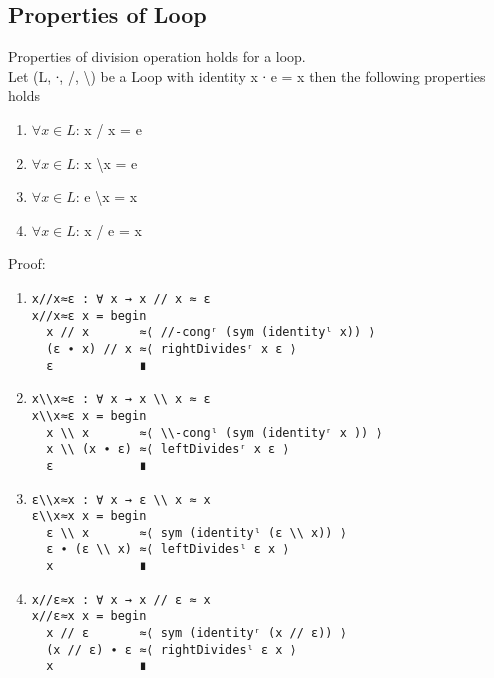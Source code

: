\subsection{Properties of Loop}
Properties of division operation holds for a loop. \\
Let (L, ∙, /, \textbackslash ) be a Loop with identity x ∙ e = x then the following properties holds 
\begin{enumerate}
\item \(\forall x \in L\): x / x = e 
\item \(\forall x \in L\):  x \textbackslash x = e
\item \(\forall x \in L\): e \textbackslash x = x 
\item \(\forall x \in L\):  x / e = x 
\end{enumerate}
Proof:
\begin{enumerate}
\item 
\begin{verbatim}
x//x≈ε : ∀ x → x // x ≈ ε
x//x≈ε x = begin
  x // x       ≈⟨ //-congʳ (sym (identityˡ x)) ⟩
  (ε ∙ x) // x ≈⟨ rightDividesʳ x ε ⟩
  ε            ∎
\end{verbatim}
\item
\begin{verbatim}
x\\x≈ε : ∀ x → x \\ x ≈ ε
x\\x≈ε x = begin
  x \\ x       ≈⟨ \\-congˡ (sym (identityʳ x )) ⟩
  x \\ (x ∙ ε) ≈⟨ leftDividesʳ x ε ⟩
  ε            ∎
\end{verbatim}
\item
\begin{verbatim}
ε\\x≈x : ∀ x → ε \\ x ≈ x
ε\\x≈x x = begin
  ε \\ x       ≈⟨ sym (identityˡ (ε \\ x)) ⟩
  ε ∙ (ε \\ x) ≈⟨ leftDividesˡ ε x ⟩
  x            ∎
\end{verbatim}
\item
\begin{verbatim}
x//ε≈x : ∀ x → x // ε ≈ x
x//ε≈x x = begin
  x // ε       ≈⟨ sym (identityʳ (x // ε)) ⟩
  (x // ε) ∙ ε ≈⟨ rightDividesˡ ε x ⟩
  x            ∎
\end{verbatim}
\end{enumerate}
